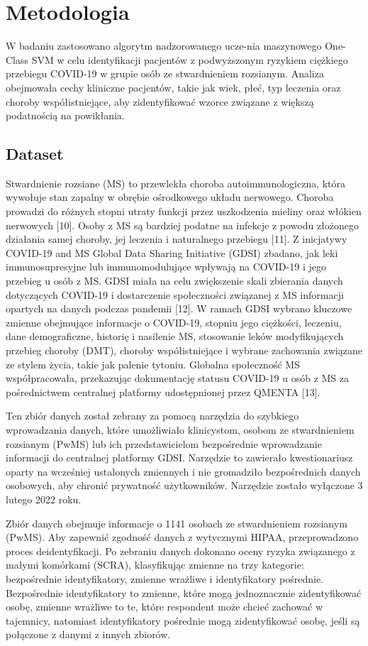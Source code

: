 \documentclass[a4paper,fleqn]{cas-dc}
\begin{document}
\section{Metodologia}
W badaniu zastosowano algorytm nadzorowanego ucze-nia maszynowego One-Class SVM w celu identyfikacji pacjentów z podwyższonym ryzykiem ciężkiego przebiegu COVID-19 w grupie osób ze stwardnieniem rozsianym. Analiza obejmowała cechy kliniczne pacjentów, takie jak wiek, płeć, typ leczenia oraz choroby współistniejące, aby zidentyfikować wzorce związane z większą podatnością na powikłania.

\subsection{Dataset}
Stwardnienie rozsiane (MS) to przewlekła choroba autoimmunologiczna, która wywołuje stan zapalny w obrębie ośrodkowego układu nerwowego. Choroba prowadzi do różnych stopni utraty funkcji przez uszkodzenia mieliny oraz włókien nerwowych [10]. Osoby z MS są bardziej podatne na infekcje z powodu złożonego działania samej choroby, jej leczenia i naturalnego przebiegu [11]. Z inicjatywy COVID-19 and MS Global Data Sharing Initiative (GDSI) zbadano, jak leki immunosupresyjne lub immunomodulujące wpływają na COVID-19 i jego przebieg u osób z MS. GDSI miała na celu zwiększenie skali zbierania danych dotyczących COVID-19 i dostarczenie społeczności związanej z MS informacji opartych na danych podczas pandemii [12]. W ramach GDSI wybrano kluczowe zmienne obejmujące informacje o COVID-19, stopniu jego ciężkości, leczeniu, dane demograficzne, historię i nasilenie MS, stosowanie leków modyfikujących przebieg choroby (DMT), choroby współistniejące i wybrane zachowania związane ze stylem życia, takie jak palenie tytoniu. Globalna społeczność MS współpracowała, przekazując dokumentację statusu COVID-19 u osób z MS za pośrednictwem centralnej platformy udostępnionej przez QMENTA [13].

Ten zbiór danych został zebrany za pomocą narzędzia do szybkiego wprowadzania danych, które umożliwiało klinicystom, osobom ze stwardnieniem rozsianym (PwMS) lub ich przedstawicielom bezpośrednie wprowadzanie informacji do centralnej platformy GDSI. Narzędzie to zawierało kwestionariusz oparty na wcześniej ustalonych zmiennych i nie gromadziło bezpośrednich danych osobowych, aby chronić prywatność użytkowników. Narzędzie zostało wyłączone 3 lutego 2022 roku.

Zbiór danych obejmuje informacje o 1141 osobach ze stwardnieniem rozsianym (PwMS). Aby zapewnić zgodność danych z wytycznymi HIPAA, przeprowadzono proces deidentyfikacji. Po zebraniu danych dokonano oceny ryzyka związanego z małymi komórkami (SCRA), klasyfikując zmienne na trzy kategorie: bezpośrednie identyfikatory, zmienne wrażliwe i identyfikatory pośrednie. Bezpośrednie identyfikatory to zmienne, które mogą jednoznacznie zidentyfikować osobę, zmienne wrażliwe to te, które respondent może chcieć zachować w tajemnicy, natomiast identyfikatory pośrednie mogą zidentyfikować osobę, jeśli są połączone z danymi z innych zbiorów.
\end{document}
